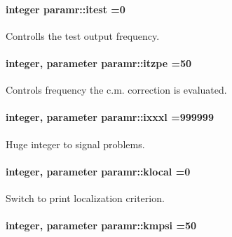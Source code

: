 \paragraph[{\texorpdfstring{itest}{itest}}]{\setlength{\rightskip}{0pt plus 5cm}integer paramr\+::itest =0}\hypertarget{namespaceparamr_a52ac61adb92cf4788f93f3284fc94eea}{}\label{namespaceparamr_a52ac61adb92cf4788f93f3284fc94eea}


Controlls the test output frequency. 

\paragraph[{\texorpdfstring{itzpe}{itzpe}}]{\setlength{\rightskip}{0pt plus 5cm}integer, parameter paramr\+::itzpe =50}\hypertarget{namespaceparamr_a3793810490c9a71b1290280848f952ab}{}\label{namespaceparamr_a3793810490c9a71b1290280848f952ab}


Controls frequency the c.\+m. correction is evaluated. 

\paragraph[{\texorpdfstring{ixxxl}{ixxxl}}]{\setlength{\rightskip}{0pt plus 5cm}integer, parameter paramr\+::ixxxl =999999}\hypertarget{namespaceparamr_a96850280b19dff419aec41c471f259fd}{}\label{namespaceparamr_a96850280b19dff419aec41c471f259fd}


Huge integer to signal problems. 

\paragraph[{\texorpdfstring{klocal}{klocal}}]{\setlength{\rightskip}{0pt plus 5cm}integer, parameter paramr\+::klocal =0}\hypertarget{namespaceparamr_ae7c591a6ca8ece03b8a7ca95857f180f}{}\label{namespaceparamr_ae7c591a6ca8ece03b8a7ca95857f180f}


Switch to print localization criterion. 

\paragraph[{\texorpdfstring{kmpsi}{kmpsi}}]{\setlength{\rightskip}{0pt plus 5cm}integer, parameter paramr\+::kmpsi =50}\hypertarget{namespaceparamr_a65de7b11ee5606af6be31579043dddbc}{}\label{namespaceparamr_a65de7b11ee5606af6be31579043dddbc}


